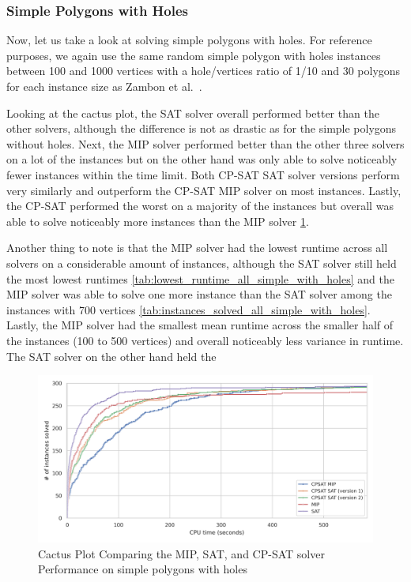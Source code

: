 \subsubsection{Simple Polygons with Holes}
Now, let us take a look at solving simple polygons with holes.
For reference purposes, we again use the same random simple polygon with holes instances between 100 and 1000 vertices with a hole/vertices ratio of 1/10 and 30 polygons for each instance size as Zambon et al.~\cite{art-gallery-instances-page}.

Looking at the cactus plot, the SAT solver overall performed better than the other solvers, although the difference is not as drastic as for the simple polygons without holes. Next, the MIP solver performed better than the other three solvers on a lot of the instances but on the other hand was only able to solve noticeably fewer instances within the time limit. Both CP-SAT SAT solver versions perform very similarly and outperform the CP-SAT MIP solver on most instances. Lastly, the CP-SAT performed the worst on a majority of the instances but overall was able to solve noticeably more instances than the MIP solver \cref{fig:cactus_all_simple_with_holes}.

Another thing to note is that the MIP solver had the lowest runtime across all solvers on a considerable amount of instances, although the SAT solver still held the most lowest runtimes \cref{tab:lowest_runtime_all_simple_with_holes} and the MIP solver was able to solve one more instance than the SAT solver among the instances with 700 vertices \cref{tab:instances_solved_all_simple_with_holes}. Lastly, the MIP solver had the smallest mean runtime across the smaller half of the instances (100 to 500 vertices) and overall noticeably less variance in runtime. The SAT solver on the other hand held the 

\begin{figure}[htbp]
\centering
\includegraphics[scale=0.7]{Thesis/figures/final_benchmark_cactus_plot_runtime_MIP_SAT_CPSAT_with_holes.png}
\caption{Cactus Plot Comparing the MIP, SAT, and CP-SAT solver Performance on simple polygons with holes}
\label{fig:cactus_all_simple_with_holes}
\end{figure}

